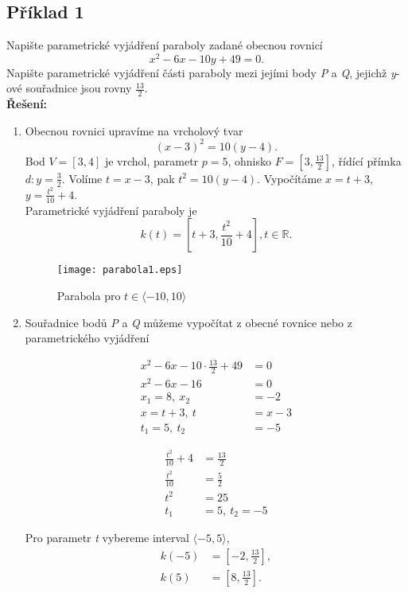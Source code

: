		      \subsection*{Příklad 1}
		      Napište parametrické vyjádření paraboly zadané obecnou rovnicí
		      $$x^2-6x-10y+49=0.$$
		      Napište parametrické vyjádření části paraboly mezi jejími body \textit{P} a \textit{Q}, jejichž \textit{y}-ové
		      souřadnice jsou rovny $\frac{13}{2}$. \\[5pt]
		      \textbf{Řešení:}
		      \noindent\begin{enumerate}
		      \item Obecnou rovnici upravíme na vrcholový tvar
		      $$(x-3)^2=10(y-4).$$
		      Bod $V=[3,4]$ je vrchol, parametr $p=5$, ohnisko $F=\left[3,\frac{13}{2}\right]$,  řídící přímka $d: y=\frac{3}{2}$.
		      Volíme $t=x-3$, pak $t^2=10(y-4)$. Vypočítáme $x=t+3$, $y=\frac{t^2}{10}+4$.\\
		      Parametrické vyjádření paraboly je
		      $$k(t)=\left[t+3,\frac{t^2}{10}+4\right], t \in \mathbb{R}.$$
		      \vfill
		      \begin{figure}[H]
		      	\centering
		      	\texttt{[image: parabola1.eps]}
		      	\caption{Parabola pro $t \in \langle-10, 10\rangle$}
		      \end{figure}
		      				
		      \item
		      Souřadnice bodů \textit{P} a \textit{Q} můžeme vypočítat z obecné rovnice nebo z parametrického vyjádření
		      						
		      \noindent\begin{minipage}[t]{0.5\textwidth}
		      \begin{align*}
		      	x^2-6x-10\cdot\frac{13}{2}+49 & =0   \\
		      	x^2-6x-16                     & =0   \\
		      	x_1 = 8,\: x_2                & = -2 \\
		      	x = t+3,\: t                  & =x-3 \\
		      	t_1 = 5,\: t_2                & = -5 
		      \end{align*}
		\end{minipage}
		\begin{minipage}[t]{0.5\textwidth}
			\begin{align*}
				\frac{t^2}{10} + 4 & = \frac{13}{2}  \\
				\frac{t^2}{10}     & = \frac{5}{2}   \\
				t^2                & = 25            \\
				t_1                & = 5,\: t_2 = -5 
			\end{align*}
		\end{minipage}
		Pro parametr \textit{t} vybereme interval $\langle-5,5\rangle$, 
		\begin{align*}
			k(-5) & =\left[-2, \frac{13}{2}\right], \\
			k(5)  & =\left[8,\frac{13}{2}\right].   
		\end{align*}
		\end{enumerate}
